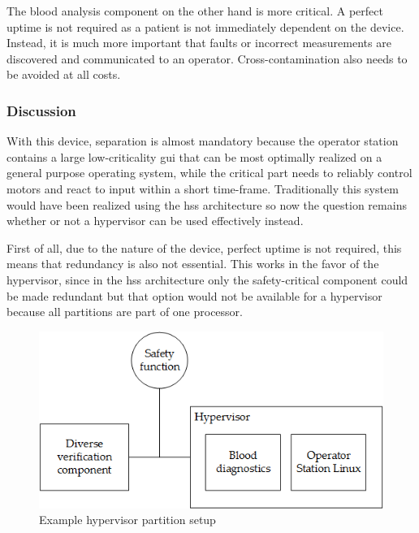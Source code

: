 The blood analysis component on the other hand is more critical. A perfect uptime is not required as a patient is not immediately dependent on the device. Instead, it is much more important that faults or incorrect measurements are discovered and communicated to an operator. Cross-contamination also needs to be avoided at all costs.

\subsubsection{Discussion}
With this device, separation is almost mandatory because the operator station contains a large low-criticality \acrshort{gui} that can be most optimally realized on a general purpose operating system, while the critical part needs to reliably control motors and react to input within a short time-frame. Traditionally this system would have been realized using the \acrshort{hss} architecture so now the question remains whether or not a hypervisor can be used effectively instead.

First of all, due to the nature of the device, perfect uptime is not required, this means that redundancy is also not essential. This works in the favor of the hypervisor, since in the \acrshort{hss} architecture only the safety-critical component could be made redundant but that option would not be available for a hypervisor because all partitions are part of one processor. 

\begin{figure}
\centering
\includegraphics[scale=0.75]{Figures/blood_diagnostics_arch}
\decoRule
\caption{Example hypervisor partition setup}
\label{fig:blood_diagnostics_hv_arch}
\end{figure}

